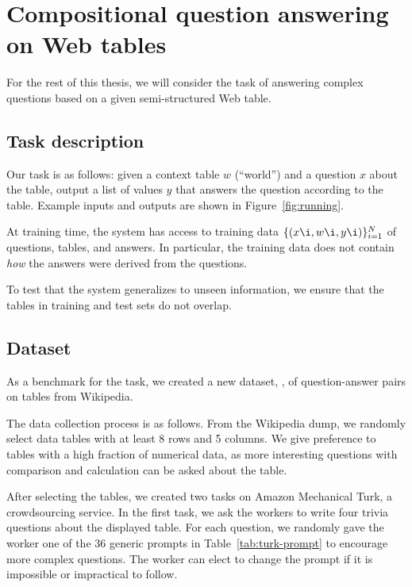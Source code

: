 \chapter{Compositional question answering
on Web tables}\label{chp:tables}


For the rest of this thesis,
we will consider the task of answering complex questions
based on a given semi-structured Web table.

\section{Task description}
Our task is as follows:
given a context table $w$ (``world'')
and a question $x$ about the table,
output a list of values $y$
that answers the question according to the table.
Example inputs and outputs are shown in Figure~\ref{fig:running}.

At training time, the system has access to training data
$\{(x\i, w\i, y\i)\}_{i=1}^N$ of questions, tables, and answers.
In particular, the training data does not contain
\emph{how} the answers were derived from the questions.

To test that the system generalizes to unseen information,
we ensure that the tables in training and test sets
do not overlap.


\section{Dataset}

As a benchmark for the task,
we created a new dataset, \wtq, of question-answer pairs
on tables from Wikipedia.


The data collection process is as follows.
From the Wikipedia dump,
we randomly select data tables with at least
8 rows and 5 columns.
We give preference to tables with a high fraction of
numerical data, as more interesting questions
with comparison and calculation can be asked about the table.

After selecting the tables,
we created two tasks on Amazon Mechanical Turk,
a crowdsourcing service.
In the first task, we ask the workers to write four
trivia questions about the displayed table.
For each question,
we randomly gave the worker one of the 36 generic prompts
in Table~\ref{tab:turk-prompt}
to encourage more complex questions.
The worker can elect to change the prompt
if it is impossible or impractical to follow.

